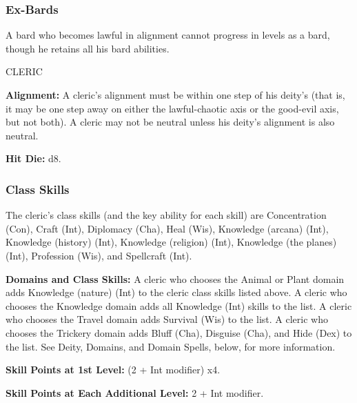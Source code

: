 \documentclass{article}
\begin{document}
\vspace{12pt}
\subsubsection*{\textbf{Ex-Bards}}

A bard who becomes lawful in alignment cannot progress in levels as a bard, though 
he retains all his bard abilities.

\vspace{12pt}
{\LARGE{}CLERIC}

\textbf{Alignment:} A cleric's alignment must be within one step of his deity's 
(that is, it may be one step away on either the lawful-chaotic axis or the good-evil 
axis, but not both). A cleric may not be neutral unless his deity's alignment is 
also neutral.

\textbf{Hit Die:} d8.

\vspace{12pt}
\subsubsection*{\textbf{Class Skills}}

The cleric's class skills (and the key ability for each skill) are Concentration 
(Con), Craft (Int), Diplomacy (Cha), Heal (Wis), Knowledge (arcana) (Int), Knowledge 
(history) (Int), Knowledge (religion) (Int), Knowledge (the planes) (Int), Profession 
(Wis), and Spellcraft (Int). 

\textbf{Domains and Class Skills:} A cleric who chooses the Animal or Plant domain 
adds Knowledge (nature) (Int) to the cleric class skills listed above. A cleric 
who chooses the Knowledge domain adds all Knowledge (Int) skills to the list. A 
cleric who chooses the Travel domain adds Survival (Wis) to the list. A cleric 
who chooses the Trickery domain adds Bluff (Cha), Disguise (Cha), and Hide (Dex) 
to the list. See Deity, Domains, and Domain Spells, below, for more information.

\textbf{Skill Points at 1st Level:} (2 + Int modifier) x$ $4.

\textbf{Skill Points at Each Additional Level:} 2 + Int modifier.

\vspace{12pt}
\subsubsection*{}
\end{document}
